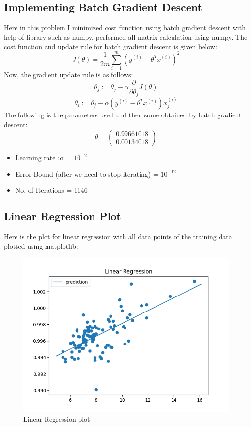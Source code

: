 \documentclass[12pt]{article}
\begin{document}
\subsection{Implementing Batch Gradient Descent} 
Here in this problem I minimized cost function using batch gradient descent with help of library such as numpy, performed all matrix calculation using numpy. The cost function and update rule for batch gradient descent is given below: 
\begin{equation}
    J(\theta) = \frac{1}{2m}\sum_{i=1}^{m}(y^{(i)} - \theta^T x^{(i)})^2
\end{equation}
Now, the gradient update rule is as follows:
\begin{equation}
    \theta_j := \theta_j - \alpha \frac{\partial}{\partial \theta_j} J(\theta) 
\end{equation}
\begin{equation}
    \theta_j := \theta_j - \alpha (y^{(i)} - \theta^T x^{(i)}) x^{(i)}_j
\end{equation}
The following is the parameters used and then some obtained by batch gradient descent:
\begin{equation}
    \theta=
    \begin{pmatrix}
        0.99661018\\
        0.00134018
    \end{pmatrix}
\end{equation}
\begin{itemize}
  \item[\ding{213}] Learning rate :$\alpha$ = $10^{-2}$
  \item[\ding{213}] Error Bound (after we need to stop iterating) =  $10^{-12}$
  \item[\ding{213}] No. of Iterations =  1146
\end{itemize}
\subsection{Linear Regression Plot}  Here is the plot for linear regression with all data points of the training data plotted using matplotlib:\\
\begin{figure}
  \includegraphics[width=\linewidth]{linearRegressionPlot.png}
  \caption{Linear Regression plot}
  \label{fig1A}
\end{figure}
\end{document}
